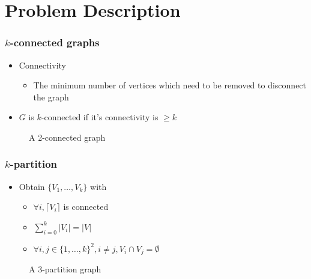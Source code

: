 \section{Problem Description}
\begin{frame}
	\frametitle{$k$-connected graphs}
	\begin{itemize}
		\item Connectivity
			\begin{itemize}
				\item The minimum number of vertices which need to be removed to disconnect the graph 
			\end{itemize}
		\item $G$ is $k$-connected if it's connectivity is $\geq k$
	\end{itemize}
	\begin{figure}
		\begin{center}
			
		\end{center}
		\caption{A 2-connected graph}
	\end{figure}
\end{frame}

\begin{frame}
  \frametitle{$k$-partition}
  \begin{itemize}
  \item Obtain $\{V_1, \dots, V_k\}$ with
    \begin{itemize}
    \item $\forall i, \lceil V_i \rceil$ is connected
    \item $\sum\limits_{i=0}^k|V_i| = |V|$
    \item $\forall i,j \in \{1, \dots, k\}^2, i \neq j, V_i \cap V_j = \emptyset$
    \end{itemize}
  \end{itemize}
  \begin{figure}
    \begin{center}
      
    \end{center}
    \caption{A 3-partition graph}
  \end{figure}
\end{frame}

